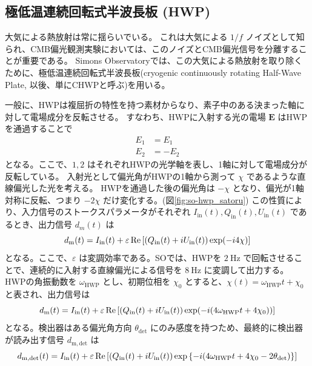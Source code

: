 \documentclass[../../main.tex]{subfiles}
\begin{document}
\subsection{極低温連続回転式半波長板 (HWP)}
大気による熱放射は常に揺らいでいる。
これは大気による $1/f$ ノイズとして知られ、CMB偏光観測実験においては、このノイズとCMB偏光信号を分離することが重要である。
Simons Observatoryでは、この大気による熱放射を取り除くために、極低温連続回転式半波長板(cryogenic continuously rotating Half-Wave Plate, 以後、単にCHWPと呼ぶ)を用いる。\cite{so:hwp_yamada}

一般に、HWPは複屈折の特性を持つ素材からなり、素子中のある決まった軸に対して電場成分を反転させる。
すなわち、HWPに入射する光の電場 $\bm{E}$ はHWPを通過することで
\begin{align}
    E_{1} &= E_{1} \\
    E_{2} &= -E_{2}
\end{align}
となる。ここで、$1, 2$ はそれぞれHWPの光学軸を表し、1軸に対して電場成分が反転している。
入射光として偏光角がHWPの1軸から測って $\chi$ であるような直線偏光した光を考える。
HWPを通過した後の偏光角は $-\chi$ となり、偏光が1軸対称に反転、つまり $-2\chi$ だけ変化する。(図\ref{fig:so-hwp_satoru})
この性質により、入力信号のストークスパラメータがそれぞれ $I_{\mathrm{in}}(t), Q_{\mathrm{in}}(t), U_{\mathrm{in}}(t)$ であるとき、出力信号 $d_m(t)$ は
\begin{equation}
    d_{\mathrm{m}}(t) = I_{\mathrm{in}}(t) + \varepsilon\Re\qty[\qty(Q_{\mathrm{in}}(t)+iU_{\mathrm{in}}(t))\exp(-i 4\chi)]
\end{equation}
となる。ここで、$\varepsilon$ は変調効率である。SOでは、HWPを $2\ \mathrm{Hz}$ で回転させることで、連続的に入射する直線偏光による信号を $8\ \mathrm{Hz}$ に変調して出力する。
HWPの角振動数を $\omega_{\mathrm{HWP}}$ とし、初期位相を $\chi_0$ とすると、$\chi(t) = \omega_{\mathrm{HWP}}t + \chi_{0}$ と表され、出力信号は
\begin{equation}
    d_{\mathrm{m}}(t) = I_{\mathrm{in}}(t) + \varepsilon\Re\qty[\qty(Q_{\mathrm{in}}(t)+iU_{\mathrm{in}}(t))\exp(-i \qty(4\omega_{\mathrm{HWP}}t + 4\chi_0))]
\end{equation}
となる。検出器はある偏光角方向 $\theta_{\mathrm{det}}$ にのみ感度を持つため、最終的に検出器が読み出す信号 $d_{\mathrm{m}, \mathrm{det}}$ は
\begin{equation}
    \label{eq:so-hwp_modulation}
    d_{\mathrm{m}, \mathrm{det}}(t) = I_{\mathrm{in}}(t) + \varepsilon\Re\qty[\qty(Q_{\mathrm{in}}(t)+iU_{\mathrm{in}}(t))\exp\qty{-i \qty(4\omega_{\mathrm{HWP}}t + 4\chi_0 - 2\theta_{\mathrm{det}})}]
\end{equation}
\end{document}
